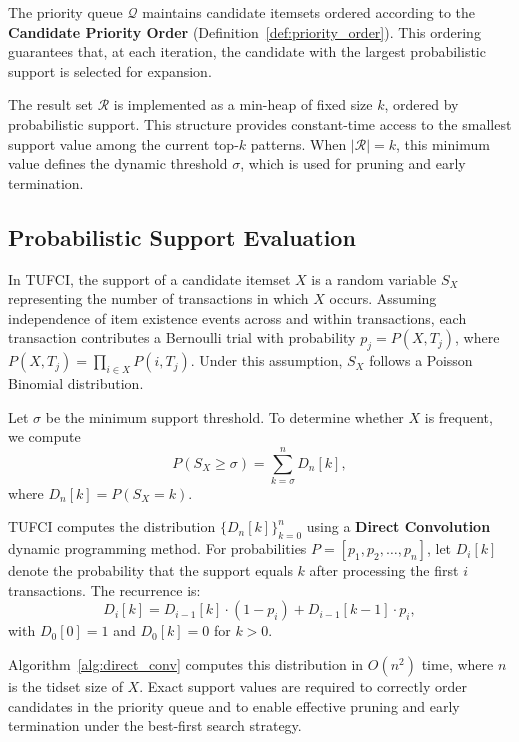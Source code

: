 \documentclass[10pt,letterpaper]{article}
\begin{document}
The priority queue $\mathcal{Q}$ maintains candidate itemsets ordered according to the \textbf{Candidate Priority Order} (Definition~\ref{def:priority_order}). This ordering guarantees that, at each iteration, the candidate with the largest probabilistic support is selected for expansion. 

The result set $\mathcal{R}$ is implemented as a min-heap of fixed size $k$, ordered by probabilistic support. This structure provides constant-time access to the smallest support value among the current top-$k$ patterns. When $|\mathcal{R}| = k$, this minimum value defines the dynamic threshold $\sigma$, which is used for pruning and early termination.


\subsection*{Probabilistic Support Evaluation}
\label{subsec:support_computation}

In TUFCI, the support of a candidate itemset $X$ is a random variable $S_X$ representing the number of transactions in which $X$ occurs. Assuming independence of item existence events across and within transactions, each transaction contributes a Bernoulli trial with probability $p_j = P(X,T_j)$, where $P(X,T_j)=\prod_{i\in X}P(i,T_j)$. Under this assumption, $S_X$ follows a Poisson Binomial distribution.

Let $\sigma$ be the minimum support threshold. To determine whether $X$ is frequent, we compute
\[
P(S_X \ge \sigma) = \sum_{k=\sigma}^{n} D_n[k],
\]
where $D_n[k]=P(S_X=k)$.

TUFCI computes the distribution $\{D_n[k]\}_{k=0}^{n}$ using a \textbf{Direct Convolution} dynamic programming method. For probabilities $P=[p_1,p_2,\ldots,p_n]$, let $D_i[k]$ denote the probability that the support equals $k$ after processing the first $i$ transactions. The recurrence is:
\begin{equation}
D_i[k] = D_{i-1}[k]\cdot(1-p_i) + D_{i-1}[k-1]\cdot p_i,
\end{equation}
with $D_0[0]=1$ and $D_0[k]=0$ for $k>0$.

Algorithm~\ref{alg:direct_conv} computes this distribution in $O(n^2)$ time, where $n$ is the tidset size of $X$. Exact support values are required to correctly order candidates in the priority queue and to enable effective pruning and early termination under the best-first search strategy.
\end{document}
